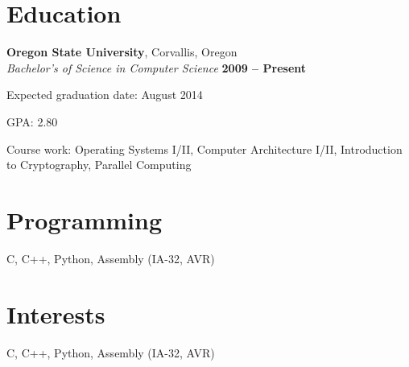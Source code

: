 \documentclass[margin,line]{resume}
\begin{document}
\begin{resume}
    \section{\mysidestyle Education}

    \textbf{Oregon State University}, Corvallis, Oregon \vspace{2mm}\\\vspace{1mm}%
    \textsl{Bachelor's of Science in Computer Science} \hfill \textbf{ 2009 -- Present}\vspace{-3mm}\\\vspace{-1mm}%
    \begin{list2}
        \item Expected graduation date: August 2014
        \item GPA:  2.80
        \item Course work: Operating Systems I/II, Computer Architecture I/II, Introduction to Cryptography, Parallel Computing
    \end{list2}\vspace{-1.5mm}


    \section{\mysidestyle Programming}

    C, C++, Python, Assembly (IA-32, AVR)

    \section{\mysidestyle Interests}

    C, C++, Python, Assembly (IA-32, AVR)







\end{resume}
\end{document}
